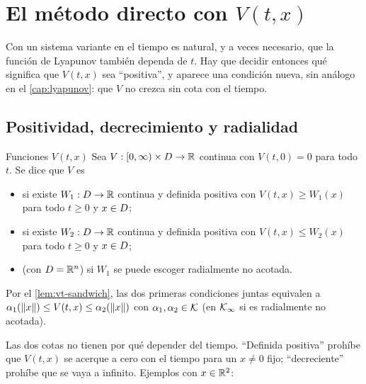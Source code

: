 \section{El método directo con \texorpdfstring{$V(t,x)$}{V(t,x)}}
\label{sec:vt-lyapunov}

Con un sistema variante en el tiempo es natural, y a veces necesario, que la función de Lyapunov también dependa de $t$. Hay que decidir entonces qué significa que $V(t,x)$ sea ``positiva'', y aparece una condición nueva, sin análogo en el \cref{cap:lyapunov}: que $V$ no crezca sin cota con el tiempo.

\subsection{Positividad, decrecimiento y radialidad}

\begin{definicion}[label=def:vt-decreciente]{Funciones $V(t,x)$ \citep[\S4.5]{Kha02}}
Sea $V:[0,\infty)\times D\to\mathbb{R}$ continua con $V(t,0)=0$ para todo $t$. Se dice que $V$ es
\begin{itemize}
  \item {} si existe $W_1:D\to\mathbb{R}$ continua y definida positiva con $V(t,x)\ge W_1(x)$ para todo $t\ge0$ y $x\in D$;
  \item {} si existe $W_2:D\to\mathbb{R}$ continua y definida positiva con $V(t,x)\le W_2(x)$ para todo $t\ge0$ y $x\in D$;
  \item {} (con $D=\mathbb{R}^n$) si $W_1$ se puede escoger radialmente no acotada.
\end{itemize}
Por el \cref{lem:vt-sandwich}, las dos primeras condiciones juntas equivalen a $\alpha_1(\left\lVert x\right\rVert)\le V(t,x)\le\alpha_2(\left\lVert x\right\rVert)$ con $\alpha_1,\alpha_2\in\mathcal{K}$ (en $\mathcal{K}_{\infty}$ si es radialmente no acotada).
\end{definicion}


Las dos cotas no tienen por qué depender del tiempo. ``Definida positiva'' prohíbe que $V(t,x)$ se acerque a cero con el tiempo para un $x\neq0$ fijo; ``decreciente'' prohíbe que se vaya a infinito. Ejemplos con $x\in\mathbb{R}^2$:

